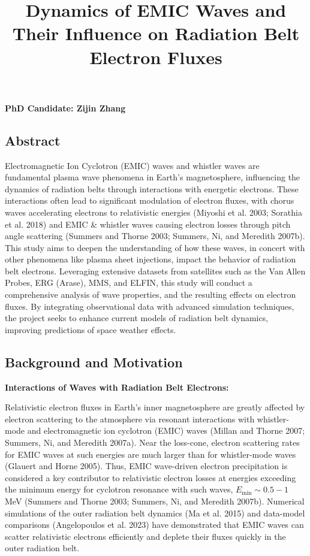 \documentclass[
  letterpaper,
  DIV=11,
  numbers=noendperiod]{scrartcl}
\title{Dynamics of EMIC Waves and Their Influence on Radiation Belt Electron Fluxes}
\author{}
\date{}
\begin{document}
\maketitle

\textbf{PhD Candidate: Zijin Zhang}

\subsection{Abstract}\label{abstract}

Electromagnetic Ion Cyclotron (EMIC) waves and whistler waves are fundamental plasma wave phenomena in Earth's magnetosphere, influencing the dynamics of radiation belts through interactions with energetic electrons. These interactions often lead to significant modulation of electron fluxes, with chorus waves accelerating electrons to relativistic energies (Miyoshi et al. 2003; Sorathia et al. 2018) and EMIC \& whistler waves causing electron losses through pitch angle scattering (Summers and Thorne 2003; Summers, Ni, and Meredith 2007b). This study aims to deepen the understanding of how these waves, in concert with other phenomena like plasma sheet injections, impact the behavior of radiation belt electrons. Leveraging extensive datasets from satellites such as the Van Allen Probes, ERG (Arase), MMS, and ELFIN, this study will conduct a comprehensive analysis of wave properties, and the resulting effects on electron fluxes. By integrating observational data with advanced simulation techniques, the project seeks to enhance current models of radiation belt dynamics, improving predictions of space weather effects.

\subsection{Background and Motivation}\label{background-and-motivation}

\textbf{Interactions of Waves with Radiation Belt Electrons:}

Relativistic electron fluxes in Earth's inner magnetosphere are greatly affected by electron scattering to the atmosphere via resonant interactions with whistler-mode and electromagnetic ion cyclotron (EMIC) waves (Millan and Thorne 2007; Summers, Ni, and Meredith 2007a). Near the loss-cone, electron scattering rates for EMIC waves at such energies are much larger than for whistler-mode waves (Glauert and Horne 2005). Thus, EMIC wave-driven electron precipitation is considered a key contributor to relativistic electron losses at energies exceeding the minimum energy for cyclotron resonance with such waves, \(E_{\min}\sim 0.5-1\) MeV (Summers and Thorne 2003; Summers, Ni, and Meredith 2007b). Numerical simulations of the outer radiation belt dynamics (Ma et al. 2015) and data-model comparisons (Angelopoulos et al. 2023) have demonstrated that EMIC waves can scatter relativistic electrons efficiently and deplete their fluxes quickly in the outer radiation belt.
\end{document}
